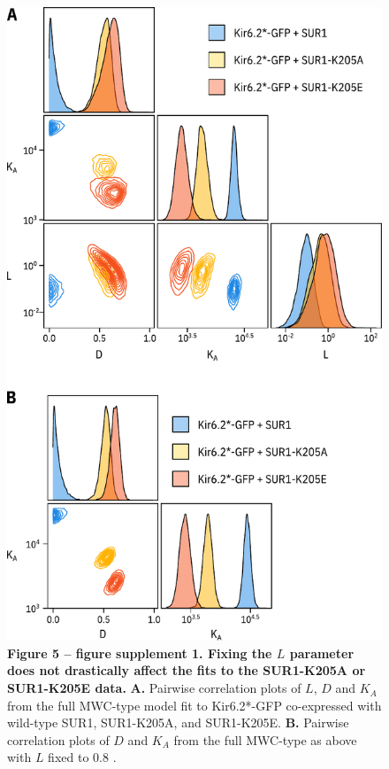 \documentclass[10pt,lineno, doublespacing]{elife_modified}
\begin{document}
\begin{figure}
\begin{fullwidth}
\centering
\includegraphics[height=0.88\textheight]{figure_five_s1}
\captionsetup{labelformat=empty}
\caption{
\textbf{Figure 5 -- figure supplement 1. Fixing the $L$ parameter does not drastically affect the fits to the SUR1-K205A or SUR1-K205E data.}
\textbf{A.}
Pairwise correlation plots of $L$, $D$ and $K_A$ from the full MWC-type model fit to Kir6.2*-GFP co-expressed with wild-type SUR1, SUR1-K205A, and SUR1-K205E.
\textbf{B.}
Pairwise correlation plots of $D$ and $K_A$ from the full MWC-type as above with $L$ fixed to 0.8 \citep{RN92}.
}
\label{fig:five_s1}
\end{fullwidth}
\end{figure}
\end{document}
